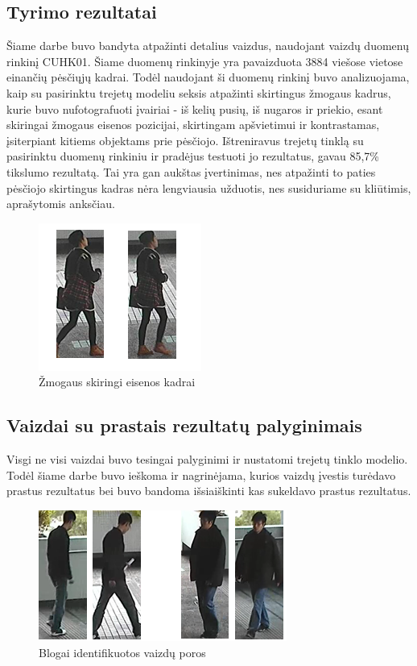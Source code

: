 \documentclass{VUMIFPSkursinis}
\begin{document}
\subsection{Tyrimo rezultatai}
Šiame darbe buvo bandyta atpažinti detalius vaizdus, naudojant vaizdų duomenų rinkinį CUHK01. Šiame duomenų rinkinyje yra pavaizduota 3884 viešose vietose einančių pėsčiųjų kadrai. Todėl naudojant ši duomenų rinkinį buvo analizuojama, kaip su pasirinktu trejetų modeliu seksis atpažinti skirtingus žmogaus kadrus, kurie buvo nufotografuoti įvairiai -  iš kelių pusių, iš nugaros ir priekio, esant skiringai žmogaus eisenos pozicijai, skirtingam apšvietimui ir kontrastamas, įsiterpiant kitiems objektams prie pėsčiojo.
\newline
Ištreniravus trejetų tinklą su pasirinktu duomenų rinkiniu ir pradėjus testuoti jo rezultatus, gavau 85,7\% tikslumo rezultatą. Tai yra gan aukštas įvertinimas, nes atpažinti to paties pėsčiojo skirtingus kadras nėra lengviausia užduotis, nes susiduriame su kliūtimis, aprašytomis anksčiau.

\begin{figure}[H]
\centering
\includegraphics[scale=1.0]{img/Frame_diff.png}
\caption{Žmogaus skiringi eisenos kadrai} %
\label{img:mlp}
\end{figure}
\subsection{Vaizdai su prastais rezultatų palyginimais}
Visgi ne visi vaizdai buvo tesingai palyginimi ir nustatomi trejetų tinklo modelio. Todėl šiame darbe buvo ieškoma ir nagrinėjama, kurios vaizdų įvestis turėdavo prastus rezultatus bei buvo bandoma išsiaiškinti kas sukeldavo prastus rezultatus.

\begin{figure}[H]
\centering
\includegraphics[scale=1.0]{img/Wrongly_detected.png}
\caption{Blogai identifikuotos vaizdų poros} %
\label{img:mlp}
\end{figure}
\end{document}
